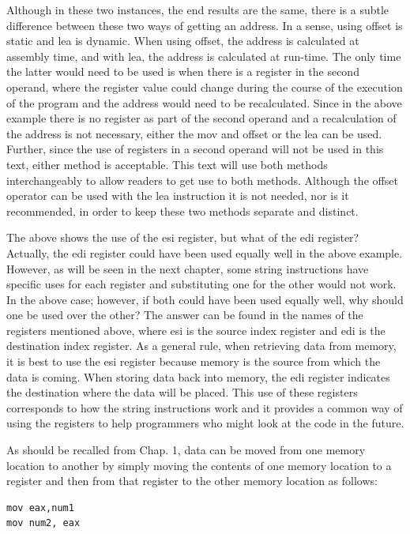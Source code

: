 \documentclass[10pt]{book}
\begin{document}
Although in these two instances, the end results are the same, there is a subtle difference between these two ways of getting an address. In a sense, using offset is static and lea is dynamic. When using offset, the address is calculated at assembly time, and with lea, the address is calculated at run-time. The only time the latter would need to be used is when there is a register in the second operand, where the register value could change during the course of the execution of the program and the address would need to be recalculated. Since in the above example there is no register as part of the second operand and a recalculation of the address is not necessary, either the mov and offset or the lea can be used. Further, since the use of registers in a second operand will not be used in this text, either method is acceptable. This text will use both methods interchangeably to allow readers to get use to both methods. Although the offset operator can be used with the lea instruction it is not needed, nor is it recommended, in order to keep these two methods separate and distinct.

The above shows the use of the esi register, but what of the edi register? Actually, the edi register could have been used equally well in the above example. However, as will be seen in the next chapter, some string instructions have specific uses for each register and substituting one for the other would not work. In the above case; however, if both could have been used equally well, why should one be used over the other? The answer can be found in the names of the registers mentioned above, where esi is the source index register and edi is the destination index register. As a general rule, when retrieving data from memory, it is best to use the esi register because memory is the source from which the data is coming. When storing data back into memory, the edi register indicates the destination where the data will be placed. This use of these registers corresponds to how the string instructions work and it provides a common way of using the registers to help programmers who might look at the code in the future.

As should be recalled from Chap. 1, data can be moved from one memory location to another by simply moving the contents of one memory location to a register and then from that register to the other memory location as follows:

\begin{verbatim}
mov eax,num1
mov num2, eax
\end{verbatim}
\end{document}
